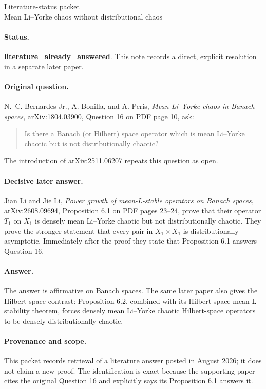 \documentclass[11pt]{article}
\begin{document}
\begin{center}
{\Large Literature-status packet}\\[4pt]
{\large Mean Li--Yorke chaos without distributional chaos}
\end{center}

\paragraph{Status.}
\textbf{literature\_already\_answered}.  This note records a direct,
explicit resolution in a separate later paper.

\paragraph{Original question.}
N.~C. Bernardes Jr., A. Bonilla, and A. Peris,
\emph{Mean Li--Yorke chaos in Banach spaces},
arXiv:1804.03900, Question 16 on PDF page 10, ask:
\begin{quote}
Is there a Banach (or Hilbert) space operator which is mean Li--Yorke
chaotic but is not distributionally chaotic?
\end{quote}
The introduction of arXiv:2511.06207 repeats this question as open.

\paragraph{Decisive later answer.}
Jian Li and Jie Li,
\emph{Power growth of mean-L-stable operators on Banach spaces},
arXiv:2608.09694, Proposition 6.1 on PDF pages 23--24, prove that their
operator \(T_1\) on \(X_1\) is densely mean Li--Yorke chaotic but not
distributionally chaotic.  They prove the stronger statement that every pair
in \(X_1\times X_1\) is distributionally asymptotic.  Immediately after the
proof they state that Proposition 6.1 answers Question 16.

\paragraph{Answer.}
The answer is affirmative on Banach spaces.  The same later paper also gives
the Hilbert-space contrast: Proposition 6.2, combined with its Hilbert-space
mean-L-stability theorem, forces densely mean Li--Yorke chaotic Hilbert-space
operators to be densely distributionally chaotic.

\paragraph{Provenance and scope.}
This packet records retrieval of a literature answer posted in August 2026;
it does not claim a new proof.  The identification is exact because the
supporting paper cites the original Question 16 and explicitly says its
Proposition 6.1 answers it.
\end{document}
